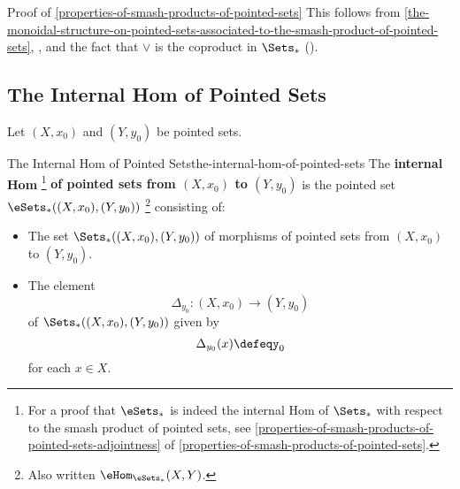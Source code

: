 \begin{Proof}{Proof of \cref{properties-of-smash-products-of-pointed-sets}}
    This follows from \cref{the-monoidal-structure-on-pointed-sets-associated-to-the-smash-product-of-pointed-sets}, , and the fact that $\vee$ is the coproduct in $\Sets_{*}$ ().
\end{Proof}
\subsection{The Internal Hom of Pointed Sets}\label{subsection-the-internal-hom-of-pointed-sets}
Let $(X,x_{0})$ and $(Y,y_{0})$ be pointed sets.
\begin{definition}{The Internal Hom of Pointed Sets}{the-internal-hom-of-pointed-sets}%
    The \textbf{internal Hom}%
    \footnote{%
        For a proof that $\eSets_{*}$ is indeed the internal Hom of $\Sets_{*}$ with respect to the smash product of pointed sets, see \cref{properties-of-smash-products-of-pointed-sets-adjointness} of \cref{properties-of-smash-products-of-pointed-sets}.
    } %
    \textbf{of pointed sets from $(X,x_{0})$ to $(Y,y_{0})$} is the pointed set $\eSets_{*}((X,x_{0}),(Y,y_{0}))$%
    \footnote{%
        Also written $\eHom_{\eSets_{*}}(X,Y)$.
        \par\vspace*{\TCBBoxCorrection}
    } %
    consisting of:
    \begin{itemize}
        \item{}The set $\Sets_{*}((X,x_{0}),(Y,y_{0}))$ of morphisms of pointed sets from $(X,x_{0})$ to $(Y,y_{0})$.
        \item{}The element%
            \[%
                \Delta_{y_{0}}%
                \colon%
                (X,x_{0})%
                \to%
                (Y,y_{0})%
            \]%
            of $\Sets_{*}((X,x_{0}),(Y,y_{0}))$ given by
            \[
                \Delta_{y_{0}}(x)%
                \defeq%
                y_{0}%
            \]%
            for each $x\in X$.
    \end{itemize}
\end{definition}
